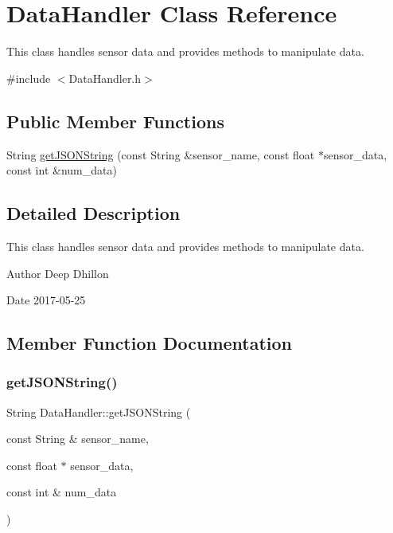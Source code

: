\hypertarget{class_data_handler}{}\section{Data\+Handler Class Reference}
\label{class_data_handler}


This class handles sensor data and provides methods to manipulate data.  




{\ttfamily \#include $<$Data\+Handler.\+h$>$}

\subsection*{Public Member Functions}
\begin{DoxyCompactItemize}
\item 
String \hyperlink{class_data_handler_a2ae077386671299a65fb6be29d4607f1}{get\+J\+S\+O\+N\+String} (const String \&sensor\+\_\+name, const float $\ast$sensor\+\_\+data, const int \&num\+\_\+data)
\end{DoxyCompactItemize}


\subsection{Detailed Description}
This class handles sensor data and provides methods to manipulate data. 

\begin{DoxyAuthor}{Author}
Deep Dhillon 
\end{DoxyAuthor}
\begin{DoxyDate}{Date}
2017-\/05-\/25 
\end{DoxyDate}


\subsection{Member Function Documentation}
\mbox{\label{class_data_handler_a2ae077386671299a65fb6be29d4607f1}} 
\subsubsection{\texorpdfstring{get\+J\+S\+O\+N\+String()}{getJSONString()}}
{\footnotesize\ttfamily String Data\+Handler\+::get\+J\+S\+O\+N\+String (\begin{DoxyParamCaption}\item[{const String \&}]{sensor\+\_\+name,  }\item[{const float $\ast$}]{sensor\+\_\+data,  }\item[{const int \&}]{num\+\_\+data }\end{DoxyParamCaption})}

